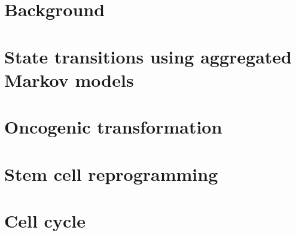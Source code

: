 \documentclass[11pt,a4paper]{report}      %
\begin{document}





\chapter{Background}






\chapter{State transitions using aggregated Markov models}
\label{cha:stamm}


\chapter{Oncogenic transformation}
\label{cha:oncog-transf}


\chapter{Stem cell reprogramming}
\label{cha:stem-cells}
 

\chapter{Cell cycle}
\label{cha:cell-cycle}
\end{document}
